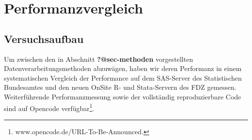 \documentclass[
  german,
  10pt,
  twoside]{article}
\makeatletter
\newcommand{\berlintime}{%
  \berlinhr=\time\relax
  \divide\berlinhr by 60\relax
  \berlinmin=\time\relax
  \multiply\berlinhr by -60\relax
  \advance\berlinmin by \berlinhr\relax
  \berlinhr=\time\relax
  \divide\berlinhr by 60\relax
  \advance\berlinhr by 1\relax
  \ifnum\berlinhr>23\relax
    \advance\berlinhr by -24\relax
  \fi
  \ifnum\berlinhr<10 0\fi\the\berlinhr:\ifnum\berlinmin<10 0\fi\the\berlinmin%
}
\newif\ifdraftmode
\providecommand{\totalchars}{0}
\providecommand{\totalwords}{0}
\providecommand{\abstractchars}{0}
\providecommand{\abstractwords}{0}
\providecommand{\zusammenfassungchars}{0}
\providecommand{\zusammenfassungwords}{0}
\providecommand{\footnotecountnum}{0}
\providecommand{\citationcountnum}{0}
\newcommand{\doctitle}{$title$}
\newcommand{\docauthors}{$author-short$}
\newcommand{\docpublication}{$publication$}
\newcommand{\docpublicationissue}{$publication-issue$}
\newcommand{\metadatapage}{%
  \clearpage
  \thispagestyle{empty}
  \onecolumn
  \vspace*{1.5cm}
  
  {\raggedright
  {\LARGE\bfseries\color{wistaBlue} Dokument-Metadaten}\\[0.5cm]
  
  \begin{tabular}{@{}ll}
    \textbf{Titel:} & \doctitle \\[0.3em]
    \textbf{Autoren:} & \docauthors \\[0.3em]
    \textbf{Veröffentlichung:} & \docpublication\ \docpublicationissue \\[0.3em]
    \textbf{Erstellungsdatum:} & \today\ um \berlintime\ Uhr \\[0.3em]
  \end{tabular}
  
  \vspace{0.5cm}
  {\color{wistaBlue}\rule{\textwidth}{1pt}}
  \par}
  
  \vspace{1cm}
  
  {\large\bfseries\color{wistaDarkGray} Dokumentstatistik}\\[0.5cm]
  
  \small
  \begin{tabular}{@{}lrrrrrr@{}}
    \toprule
    \textbf{Abschnitt} & \textbf{Wörter} & \textbf{Zeichen} & \textbf{Fußn.} & \textbf{Quellen} & \textbf{Vorgabe} \\
    \midrule
    Insgesamt & \textcolor{wistaBlue}{\textbf{\totalwords}} & \textcolor{wistaBlue}{\textbf{\totalchars}} & \textcolor{wistaBlue}{\textbf{\footnotecountnum}} & \textcolor{wistaBlue}{\textbf{\citationcountnum}} & 30\,000 Z. \\
    Zusammenfassung & \textcolor{wistaBlue}{\textbf{\zusammenfassungwords}} & \textcolor{wistaBlue}{\textbf{\zusammenfassungchars}} & --- & --- & 800 Z. \\
    Abstract & \textcolor{wistaBlue}{\textbf{\abstractwords}} & \textcolor{wistaBlue}{\textbf{\abstractchars}} & --- & --- & 700 Z. \\
    \midrule
    \sectionrows
    \bottomrule
  \end{tabular}
  \normalsize
  
  \vspace{0.5cm}
  
  {\large\bfseries\color{wistaDarkGray} Schlüsselwörter}\\[0.3cm]
  \small
  \schlusselworterlist
  \normalsize
  
  \vspace{0.5cm}
  
  {\large\bfseries\color{wistaDarkGray} Keywords}\\[0.3cm]
  \small
  \keywordslist
  \normalsize
  
  \vspace{1cm}
  
  {\large\bfseries\color{wistaDarkGray} Tabellen}\\[0.3cm]
  
  \small
  \begin{tabular}{@{}lp{12cm}@{}}
    \toprule
    \textbf{Nr.} & \textbf{Beschreibung} \\
    \midrule
    \tablerows
    \bottomrule
  \end{tabular}
  \normalsize
  
  \vspace{1cm}
  
  {\large\bfseries\color{wistaDarkGray} Abbildungen}\\[0.3cm]
  
  \small
  \begin{tabular}{@{}lp{12cm}@{}}
    \toprule
    \textbf{Nr.} & \textbf{Beschreibung} \\
    \midrule
    \figurerows
    \bottomrule
  \end{tabular}
  \normalsize
  
  \clearpage
}
\makeatother
\begin{document}
\newcommand{\tablerows}{            \hyperref[tbl-pkg-versions]{Tabelle~1} & Versionen verfügbarer R-Packages \\
            \hyperref[tbl-baseline]{Tabelle~2} & Baselines in SAS und Stata (anhand 1\% des simuliertes BTP) \\
            \hyperref[tbl-benchmark-small]{Tabelle~3} & Performanz Messungen für die Fallzahlberechnung anhand 1\% des BTP \\
            \hyperref[tbl-benchmark-regr-small]{Tabelle~4} & Performanz Messungen für die Regressionsberechnung anhand 1\% des BTP \\
            \hyperref[tbl-benchmark]{Tabelle~5} & Performanz Messungen für die Fallzahlberechnung anhand 10\% des BTP \\
            \hyperref[tbl-benchmark-regr]{Tabelle~6} & Performanz Messungen für die Regressionsberechnung anhand 10\% des BTP \\
            \hyperref[tbl-bm-cnt-small]{Tabelle~7} & Benchmarkergebnisse für Fallzahlen (kleine Stichproben des BTP) \\
            \hyperref[tbl-bm-reg-small]{Tabelle~8} & Benchmarkergebnisse für Regression (kleine Stichproben des BTP) \\
}
\newcommand{\figurerows}{            \hyperref[fig-optimization-strategies]{Abbildung~1} & Strategien zur Performanz-Optimierung im FDZ-Bund \\
}
\newcommand{\schlusselworterlist}{}
\newcommand{\keywordslist}{}
\ifdraftmode
\metadatapage
\fi

\section{Performanzvergleich}\label{sec-performance}

\subsection{Versuchsaufbau}\label{versuchsaufbau}

Um zwischen den in Abschnitt \textbf{?@sec-methoden} vorgestellten
Datenverarbeitungsmethoden abzuwägen, haben wir deren Performanz in
einem systematischen Vergleich der Performance auf dem SAS-Server des
Statistischen Bundesamtes und den neuen OnSite R- und Stata-Servern des
FDZ gemessen. Weiterführende Performanzmessung sowie der vollständig
reproduzierbare Code sind auf Opencode verfügbar\footnote{www.opencode.de/URL-To-Be-Announced.}.
\end{document}
